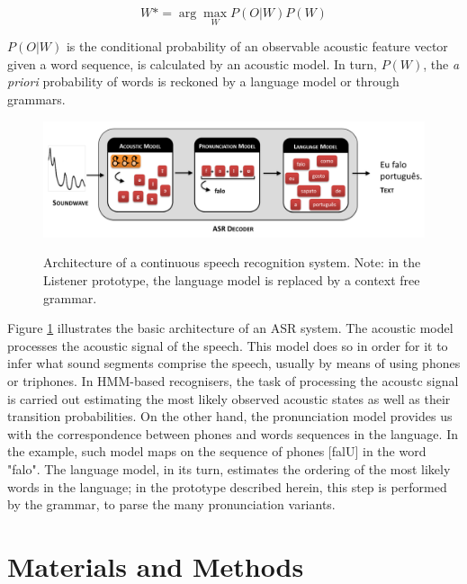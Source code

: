 \documentclass[twocolumn]{bmcart}%
\begin{document}
\begin{equation}
W*= \arg\max_{W}P(O|W)P(W)
\end{equation}

$P(O|W)$ is the conditional probability of an observable acoustic feature vector given a word sequence, is calculated by an acoustic model. In turn, $P(W)$, the \emph{a priori} probability of words is reckoned by a language model or through grammars. 

\begin{figure}[!ht]

        {\includegraphics[width=1.7\linewidth]{gfx/asr-architecture.pdf}}
        \caption{Architecture of a continuous speech recognition system. Note: in the Listener prototype, the language model is replaced by a context free grammar.}
        \label{fig:asr-gen-architecture}
\end{figure}

Figure \ref{fig:asr-gen-architecture} illustrates the basic architecture of an ASR system. The acoustic model processes the acoustic signal of the speech. This model does so in order for it to infer what sound segments comprise the speech, usually by means of using phones or triphones. In HMM-based recognisers, the task of processing the acoustc signal is carried out estimating the most likely observed acoustic states as well as their transition probabilities. On the other hand, the pronunciation model provides us with the correspondence between phones and words sequences in the language. In the example, such model maps on the sequence of phones [falU] in the word "falo". The language model, in its turn, estimates the ordering of the most likely words in the language; in the prototype described herein, this step is performed by the grammar, to parse the many pronunciation variants.

\section{Materials and Methods}\label{method}
\end{document}

